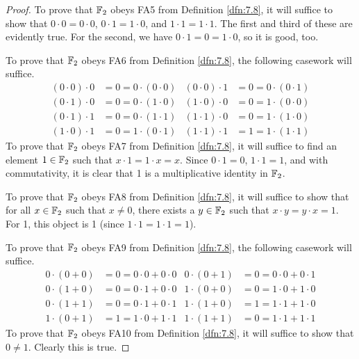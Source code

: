 \documentclass[../main.tex]{subfiles}
\begin{document}
\begin{exercise}
\begin{proof}
        To prove that $\mathbb{F}_2$ obeys FA5 from Definition \ref{dfn:7.8}, it will suffice to show that $0\cdot 0=0\cdot 0$, $0\cdot 1=1\cdot 0$, and $1\cdot 1=1\cdot 1$. The first and third of these are evidently true. For the second, we have $0\cdot 1=0=1\cdot 0$, so it is good, too.\par
        To prove that $\mathbb{F}_2$ obeys FA6 from Definition \ref{dfn:7.8}, the following casework will suffice.
        \begin{align*}
            (0\cdot 0)\cdot 0 &= 0 = 0\cdot (0\cdot 0)&
            (0\cdot 0)\cdot 1 &= 0 = 0\cdot (0\cdot 1)\\
            (0\cdot 1)\cdot 0 &= 0 = 0\cdot (1\cdot 0)&
            (1\cdot 0)\cdot 0 &= 0 = 1\cdot (0\cdot 0)\\
            (0\cdot 1)\cdot 1 &= 0 = 0\cdot (1\cdot 1)&
            (1\cdot 1)\cdot 0 &= 0 = 1\cdot (1\cdot 0)\\
            (1\cdot 0)\cdot 1 &= 0 = 1\cdot (0\cdot 1)&
            (1\cdot 1)\cdot 1 &= 1 = 1\cdot (1\cdot 1)
        \end{align*}
        To prove that $\mathbb{F}_2$ obeys FA7 from Definition \ref{dfn:7.8}, it will suffice to find an element $1\in\mathbb{F}_2$ such that $x\cdot 1=1\cdot x=x$. Since $0\cdot 1=0$, $1\cdot 1=1$, and with commutativity, it is clear that 1 is a multiplicative identity in $\mathbb{F}_2$.\par
        To prove that $\mathbb{F}_2$ obeys FA8 from Definition \ref{dfn:7.8}, it will suffice to show that for all $x\in\mathbb{F}_2$ such that $x\neq 0$, there exists a $y\in\mathbb{F}_2$ such that $x\cdot y=y\cdot x=1$. For 1, this object is 1 (since $1\cdot 1=1\cdot 1=1$).\par
        To prove that $\mathbb{F}_2$ obeys FA9 from Definition \ref{dfn:7.8}, the following casework will suffice.
        \begin{align*}
            0\cdot(0+0) &= 0 = 0\cdot 0+0\cdot 0&
            0\cdot(0+1) &= 0 = 0\cdot 0+0\cdot 1\\
            0\cdot(1+0) &= 0 = 0\cdot 1+0\cdot 0&
            1\cdot(0+0) &= 0 = 1\cdot 0+1\cdot 0\\
            0\cdot(1+1) &= 0 = 0\cdot 1+0\cdot 1&
            1\cdot(1+0) &= 1 = 1\cdot 1+1\cdot 0\\
            1\cdot(0+1) &= 1 = 1\cdot 0+1\cdot 1&
            1\cdot(1+1) &= 0 = 1\cdot 1+1\cdot 1
        \end{align*}
        To prove that $\mathbb{F}_2$ obeys FA10 from Definition \ref{dfn:7.8}, it will suffice to show that $0\neq 1$. Clearly this is true.
    \end{proof}
\end{exercise}
\end{document}
